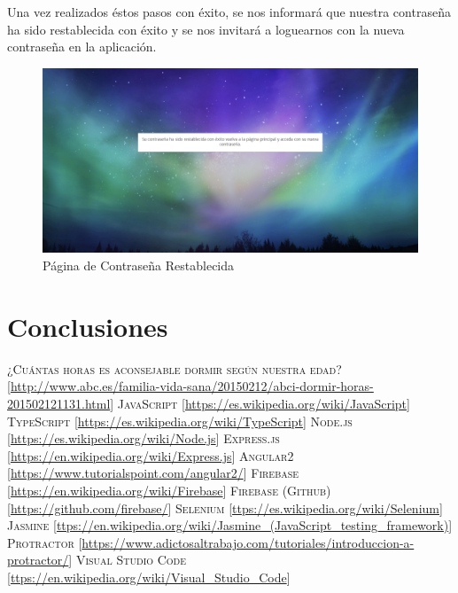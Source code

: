 \documentclass[11pt,openany]{book}
\begin{document}
Una vez realizados éstos pasos con éxito, se nos informará que nuestra contraseña ha sido restablecida con éxito y se nos invitará a loguearnos con la nueva contraseña en la aplicación.

\begin{figure}[H]
\centering
\includegraphics[totalheight=7cm]{manualUsuario/contrase_aRestablecida.png}
\caption{Página de Contraseña Restablecida}
\end{figure}

\chapter{Conclusiones}


\begin{thebibliography}{References}
 \textsc{¿Cuántas horas es aconsejable dormir según nuestra edad?} [\url{http://www.abc.es/familia-vida-sana/20150212/abci-dormir-horas-201502121131.html}]
 \textsc{JavaScript} [\url{https://es.wikipedia.org/wiki/JavaScript}]
 \textsc{TypeScript} [\url{https://es.wikipedia.org/wiki/TypeScript}]
 \textsc{Node.js} [\url{https://es.wikipedia.org/wiki/Node.js}]
 \textsc{Express.js} [\url{https://en.wikipedia.org/wiki/Express.js}]
 \textsc{Angular2} [\url{https://www.tutorialspoint.com/angular2/}]
 \textsc{Firebase} [\url{https://en.wikipedia.org/wiki/Firebase}]
 \textsc{Firebase (Github)} [\url{https://github.com/firebase/}]
 \textsc{Selenium} [\url{ttps://es.wikipedia.org/wiki/Selenium}]
 \textsc{Jasmine} [\url{ttps://en.wikipedia.org/wiki/Jasmine_(JavaScript_testing_framework)}]
 \textsc{Protractor} [\url{https://www.adictosaltrabajo.com/tutoriales/introduccion-a-protractor/}]
 \textsc{Visual Studio Code} [\url{ttps://en.wikipedia.org/wiki/Visual_Studio_Code}]
\end{thebibliography}

\appendix %
\printnotes*
\end{document}

